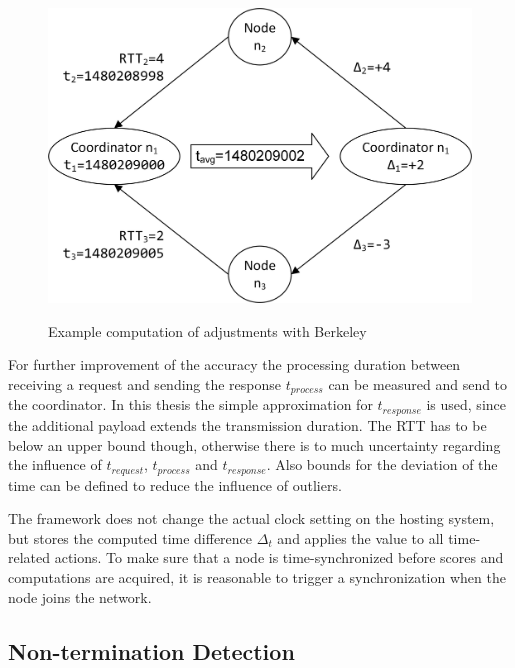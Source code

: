 		\begin{figure}[!htbp] %
			\caption{Example computation of adjustments with Berkeley}
			\includegraphics[scale=1.0]{figures/berkeley-example.png}
			\label{figure:berkeley example}
		\end{figure}
	
		 For further improvement of the accuracy the processing duration between receiving a request and sending the response $t_{process}$ can be measured and send to the coordinator. In this thesis the simple approximation for $t_{response}$ is used, since the additional payload extends the transmission duration. The \gls{RTT} has to be below an upper bound though, otherwise there is to much uncertainty regarding the influence of $t_{request}$, $t_{process}$ and $t_{response}$.
		 Also bounds for the deviation of the time can be defined to reduce the influence of outliers.
		 
		 The framework does not change the actual clock setting on the hosting system, but stores the computed time difference $\Delta_t$ and applies the value to all time-related actions. To make sure that a node is time-synchronized before scores and computations are acquired, it is reasonable to trigger a synchronization when the node joins the network. 
		 
		\FloatBarrier
		
		\subsection{Non-termination Detection}
		\label{Non-termination Detection}
		
